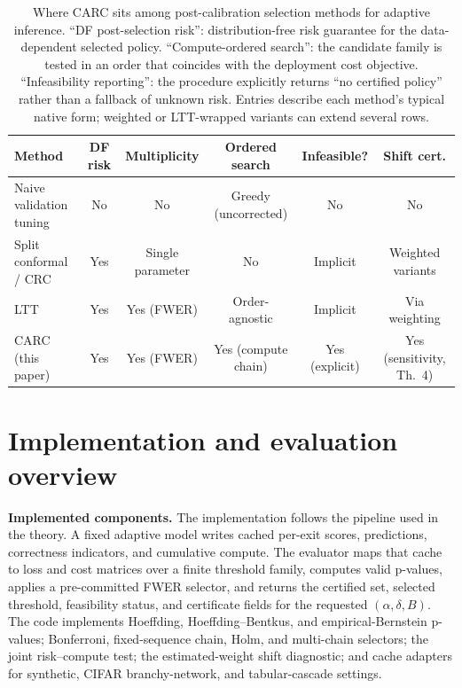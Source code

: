 \documentclass{ieeeaccess}
\begin{document}
\begin{table}[t]
\centering
\caption{Where CARC sits among post-calibration selection methods for adaptive inference. ``DF post-selection risk'': distribution-free risk guarantee for the data-dependent selected policy. ``Compute-ordered search'': the candidate family is tested in an order that coincides with the deployment cost objective. ``Infeasibility reporting'': the procedure explicitly returns ``no certified policy'' rather than a fallback of unknown risk. Entries describe each method's typical native form; weighted or LTT-wrapped variants can extend several rows.}
\label{tab:method-comparison}
\scriptsize
\setlength{\tabcolsep}{4pt}
\begin{tabular}{@{}lccccc@{}}
\toprule
Method & DF risk & Multiplicity & Ordered search & Infeasible? & Shift cert. \\
\midrule
Naive validation tuning & No & No & Greedy (uncorrected) & No & No \\
Split conformal / CRC \cite{bates2021distributionfree,angelopoulos2024conformal} & Yes & Single parameter & No & Implicit & Weighted variants \\
LTT \cite{angelopoulos2025learn} & Yes & Yes (FWER) & Order-agnostic & Implicit & Via weighting \\
CARC (this paper) & Yes & Yes (FWER) & Yes (compute chain) & Yes (explicit) & Yes (sensitivity, Th.~4) \\
\bottomrule
\end{tabular}
\end{table}

\section{Implementation and evaluation overview}

\textbf{Implemented components.} The implementation follows the pipeline used in the theory. A fixed adaptive model writes cached per-exit scores, predictions, correctness indicators, and cumulative compute. The evaluator maps that cache to loss and cost matrices over a finite threshold family, computes valid p-values, applies a pre-committed FWER selector, and returns the certified set, selected threshold, feasibility status, and certificate fields for the requested $(\alpha,\delta,B)$. The code implements Hoeffding, Hoeffding--Bentkus, and empirical-Bernstein p-values; Bonferroni, fixed-sequence chain, Holm, and multi-chain selectors; the joint risk--compute test; the estimated-weight shift diagnostic; and cache adapters for synthetic, CIFAR branchy-network, and tabular-cascade settings.
\end{document}
